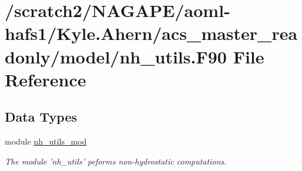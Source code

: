 \section{/scratch2/\-N\-A\-G\-A\-P\-E/aoml-\/hafs1/\-Kyle.Ahern/acs\-\_\-master\-\_\-readonly/model/nh\-\_\-utils.F90 File Reference}
\label{nh__utils_8F90}
\subsection*{Data Types}
\begin{DoxyCompactItemize}
\item 
module \hyperlink{classnh__utils__mod}{nh\-\_\-utils\-\_\-mod}
\begin{DoxyCompactList}\small\item\em The module 'nh\-\_\-utils' peforms non-\/hydrostatic computations. \end{DoxyCompactList}\end{DoxyCompactItemize}
